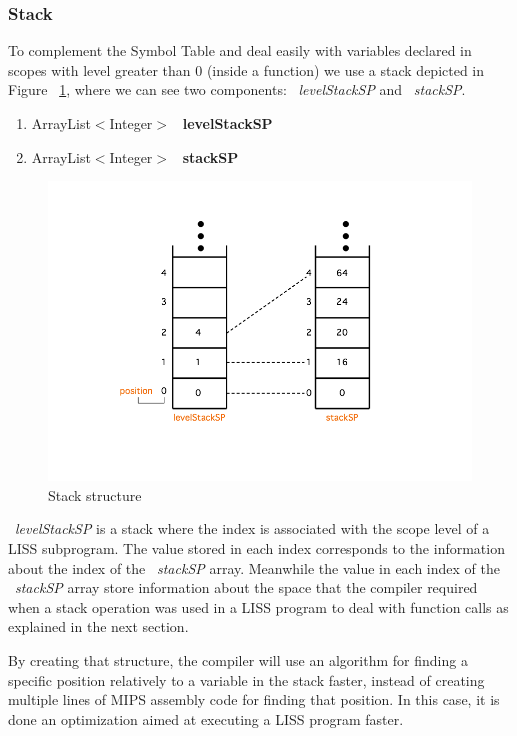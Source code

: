 \documentclass[
  oneside,
  11pt, a4paper,
  footinclude=true,
  headinclude=true,
  cleardoublepage=empty
]{scrbook}
\begin{document}
\subsubsection{Stack}

To complement the Symbol Table and deal easily with variables declared in scopes with level greater than 0 (inside a function) we use a stack depicted in Figure ~\ref{fig:stack_symbol_table}, where we can see two components: ~\textit{levelStackSP} and ~\textit{stackSP}.

\begin{enumerate}
\item ArrayList$<$Integer$>$ ~\textbf{levelStackSP}
\item ArrayList$<$Integer$>$ ~\textbf{stackSP}
\end{enumerate}

\begin{figure}[h!]
  \centering
    \includegraphics[width=1\textwidth]{img/stackSymbolTable.png}
    \caption{Stack structure}
    \label{fig:stack_symbol_table}
\end{figure}

 ~\textit{levelStackSP} is a stack where the index is associated with the scope level of a LISS subprogram.
The value stored in each index corresponds to the information about the index of the  ~\textit{stackSP} array.
Meanwhile the value in each index of the ~\textit{stackSP} array store information about the space that the compiler required when a stack operation was used in a LISS program to deal with function calls as explained in the next section.

By creating that structure, the compiler will use an algorithm for finding a specific position relatively to a variable in the stack faster, instead of creating multiple lines of MIPS assembly code for finding that position. In this case, it is done an optimization aimed at executing a LISS program faster.
\end{document}
